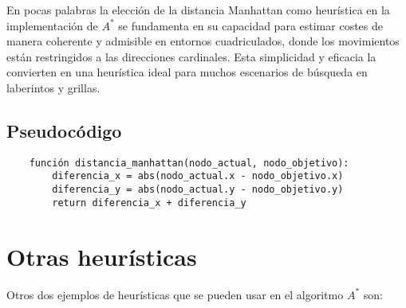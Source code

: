 En pocas palabras la elección de la distancia Manhattan como heurística en la implementación de 
$A^{*}$ se fundamenta en su capacidad para estimar costes de manera coherente y admisible en entornos 
cuadriculados, donde los movimientos están restringidos a las direcciones cardinales. 
Esta simplicidad y eficacia la convierten en una heurística ideal para muchos escenarios de búsqueda 
en laberintos y grillas.

\subsection*{Pseudocódigo}

\begin{verbatim}
    función distancia_manhattan(nodo_actual, nodo_objetivo):
        diferencia_x = abs(nodo_actual.x - nodo_objetivo.x)
        diferencia_y = abs(nodo_actual.y - nodo_objetivo.y)
        return diferencia_x + diferencia_y
    \end{verbatim}

\section{Otras heurísticas}

Otros dos ejemplos de heurísticas que se pueden usar en el algoritmo $A^{*}$ son:

